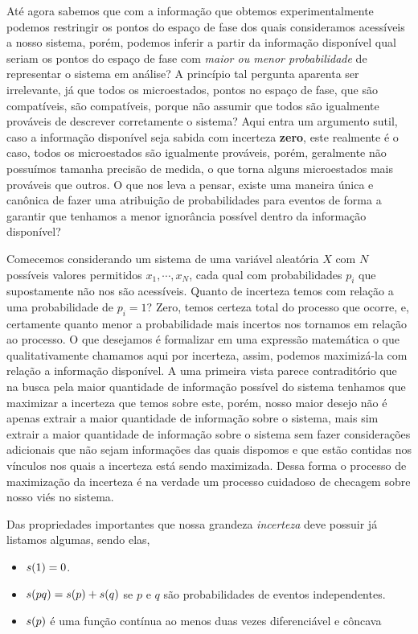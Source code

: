 \documentclass[twoside]{amsart}
\numberwithin{equation}{section}
\begin{document}
Até agora sabemos que com a informação que obtemos experimentalmente podemos restringir os pontos do espaço de fase dos quais consideramos acessíveis a nosso sistema, porém, podemos inferir a partir da informação disponível qual seriam os pontos do espaço de fase com \emph{maior ou menor probabilidade} de representar o sistema em análise? A princípio tal pergunta aparenta ser irrelevante, já que todos os microestados, pontos no espaço de fase, que são compatíveis, são compatíveis, porque não assumir que todos são igualmente prováveis de descrever corretamente o sistema? Aqui entra um argumento sutil, caso a informação disponível seja sabida com incerteza \textbf{zero}, este realmente é o caso, todos os microestados são igualmente prováveis, porém, geralmente não possuímos tamanha precisão de medida, o que torna alguns microestados mais prováveis que outros. O que nos leva a pensar, existe uma maneira única e canônica de fazer uma atribuição de probabilidades para eventos de forma a garantir que tenhamos a menor ignorância possível dentro da informação disponível?

Comecemos considerando um sistema de uma variável aleatória $X$ com $N$ possíveis valores permitidos $x_1,\cdots,x_N$, cada qual com probabilidades $p_i$ que supostamente não nos são acessíveis. Quanto de incerteza temos com relação a uma probabilidade de $p_i=1$? Zero, temos certeza total do processo que ocorre, e, certamente quanto menor a probabilidade mais incertos nos tornamos em relação ao processo. O que desejamos é formalizar em uma expressão matemática o que qualitativamente chamamos aqui por incerteza, assim, podemos maximizá-la com relação a informação disponível. A uma primeira vista parece contraditório que na busca pela maior quantidade de informação possível do sistema tenhamos que maximizar a incerteza que temos sobre este, porém, nosso maior desejo não é apenas extrair a maior quantidade de informação sobre o sistema, mais sim extrair a maior quantidade de informação sobre o sistema sem fazer considerações adicionais que não sejam informações das quais dispomos e que estão contidas nos vínculos nos quais a incerteza está sendo maximizada. Dessa forma o processo de maximização da incerteza é na verdade um processo cuidadoso de checagem sobre nosso viés no sistema.

Das propriedades importantes que nossa grandeza \emph{incerteza} deve possuir já listamos algumas, sendo elas,

\begin{itemize}
    \item $s\qty(1)=0$.
    \item $s\qty(pq)=s\qty(p)+s\qty(q)$ se $p$ e $q$ são probabilidades de eventos independentes.
    \item $s\qty(p)$ é uma função contínua ao menos duas vezes diferenciável e côncava
\end{itemize}
\end{document}

